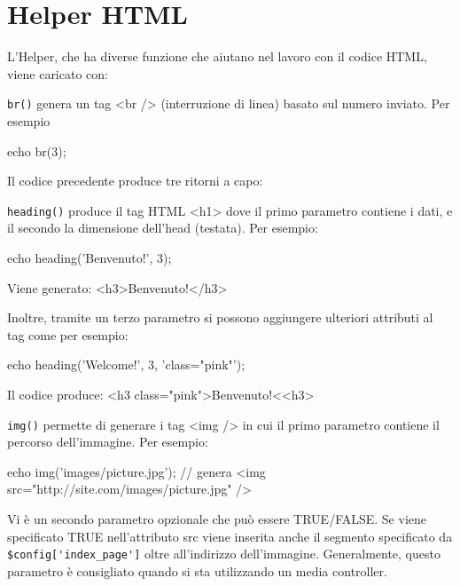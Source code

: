 \section{Helper HTML}
\label{helper:html}

L'Helper, che ha diverse funzione che aiutano nel lavoro con il codice HTML, viene caricato con:


\verb|br()| genera un tag <br /> (interruzione di linea) basato sul numero inviato. Per esempio

\begin{code}
echo br(3);
\end{code}

Il codice precedente produce tre ritorni a capo: 

\verb|heading()| produce il tag HTML <h1> dove il primo parametro contiene i dati, e il secondo la dimensione dell'head (testata). Per esempio:

\begin{code}
echo heading('Benvenuto!', 3);
\end{code}

Viene generato: <h3>Benvenuto!</h3>

Inoltre, tramite un terzo parametro si possono aggiungere ulteriori attributi al tag come per esempio:

\begin{code}
echo heading('Welcome!', 3, 'class="pink"');
\end{code}

Il codice produce: <h3 class="pink">Benvenuto!<<h3>

\verb|img()| permette di generare i tag <img /> in cui il primo parametro contiene il percorso dell'immagine. Per esempio:

\begin{code}
echo img('images/picture.jpg');
// genera <img src="http://site.com/images/picture.jpg" />
\end{code}

Vi è un secondo parametro opzionale che può essere TRUE/FALSE. Se viene specificato TRUE nell'attributo src viene inserita anche il segmento specificato da \verb|$config['index_page']| oltre all'indirizzo dell'immagine. Generalmente, questo parametro è consigliato quando si sta utilizzando un media controller.

